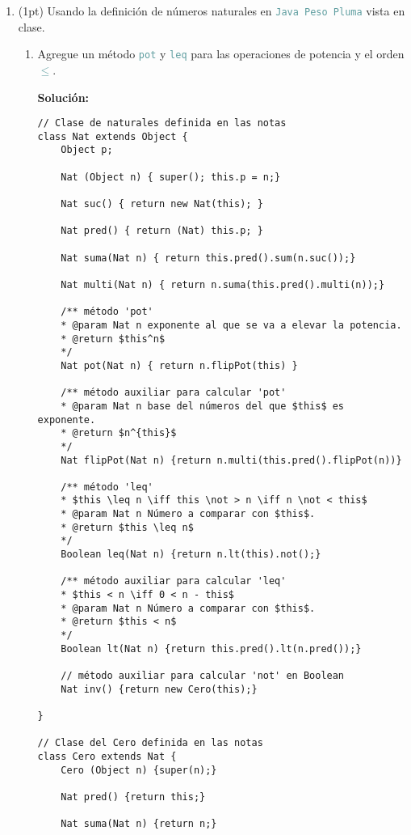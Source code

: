 \documentclass{article}
\newcommand{\tp}[1]{\textcolor{CadetBlue} {\texttt{#1}}}
\newcommand{\tb}[1]{\textcolor{RoyalPurple} {\textbf{#1}}}
\newcommand{\pt}[1]{\textcolor{RoyalPurple}{(#1pt)}}
\begin{document}
\begin{enumerate}
        \item \pt{1} Usando la definición de números naturales en
        \tp{Java Peso Pluma} vista en clase.

        \begin{enumerate}
            \item Agregue un método \tp{pot} y \tp{leq} para las operaciones de
            potencia y el orden \tp{$\leq$}.

            \tb{Solución:}

            \begin{verbatim}
// Clase de naturales definida en las notas
class Nat extends Object {
    Object p;

    Nat (Object n) { super(); this.p = n;}

    Nat suc() { return new Nat(this); }

    Nat pred() { return (Nat) this.p; }

    Nat suma(Nat n) { return this.pred().sum(n.suc());}

    Nat multi(Nat n) { return n.suma(this.pred().multi(n));}

    /** método 'pot'
    * @param Nat n exponente al que se va a elevar la potencia.
    * @return $this^n$
    */
    Nat pot(Nat n) { return n.flipPot(this) }

    /** método auxiliar para calcular 'pot'
    * @param Nat n base del números del que $this$ es exponente.
    * @return $n^{this}$
    */
    Nat flipPot(Nat n) {return n.multi(this.pred().flipPot(n))}

    /** método 'leq'
    * $this \leq n \iff this \not > n \iff n \not < this$
    * @param Nat n Número a comparar con $this$.
    * @return $this \leq n$
    */
    Boolean leq(Nat n) {return n.lt(this).not();}

    /** método auxiliar para calcular 'leq'
    * $this < n \iff 0 < n - this$
    * @param Nat n Número a comparar con $this$.
    * @return $this < n$
    */
    Boolean lt(Nat n) {return this.pred().lt(n.pred());}

    // método auxiliar para calcular 'not' en Boolean
    Nat inv() {return new Cero(this);}

}

// Clase del Cero definida en las notas
class Cero extends Nat {
    Cero (Object n) {super(n);}

    Nat pred() {return this;}

    Nat suma(Nat n) {return n;}


\end{verbatim}
\end{enumerate}
\end{enumerate}
\end{document}
